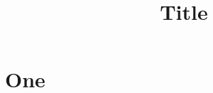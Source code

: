 \documentclass[12pt,a4paper]{article}
\title{Title}
\begin{document}
\maketitle

\section{One}
\end{document}
